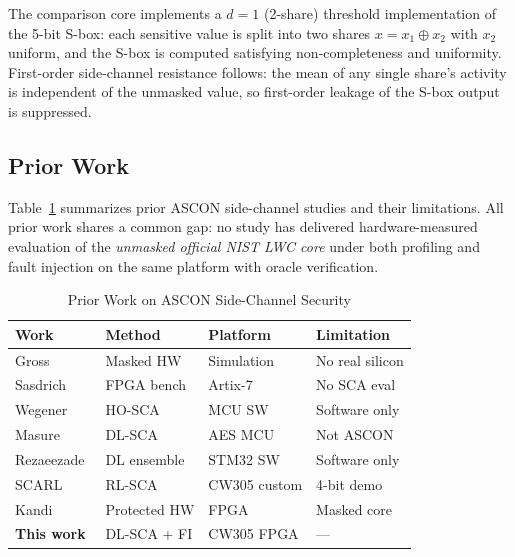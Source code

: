 \documentclass[conference]{IEEEtran}
\begin{document}
The comparison core implements a $d=1$ (2-share) threshold
implementation of the 5-bit S-box: each sensitive value is
split into two shares $x = x_1 \oplus x_2$ with $x_2$ uniform,
and the S-box is computed satisfying non-completeness and
uniformity. First-order side-channel resistance follows: the
mean of any single share's activity is independent of the
unmasked value, so first-order leakage of the S-box output is
suppressed.

\subsection{Prior Work}

Table~\ref{tab:related} summarizes prior ASCON side-channel
studies and their limitations. All prior work shares a common
gap: no study has delivered hardware-measured evaluation of
the \emph{unmasked official NIST LWC core} under both profiling
and fault injection on the same platform with oracle verification.

\begin{table}[htbp]
  \caption{Prior Work on ASCON Side-Channel Security}
  \label{tab:related}
  \centering
  \begin{tabular}{p{1.8cm} p{2.0cm} p{1.5cm} p{1.5cm}}
    \toprule
    \textbf{Work} & \textbf{Method} &
    \textbf{Platform} & \textbf{Limitation} \\
    \midrule
    Gross~\cite{gross2015ascon}
      & Masked HW & Simulation & No real silicon \\
    Sasdrich~\cite{sasdrich2015ascon}
      & FPGA bench & Artix-7 & No SCA eval \\
    Wegener~\cite{wegener2024ascon}
      & HO-SCA & MCU SW & Software only \\
    Masure~\cite{masure2020dlsca}
      & DL-SCA & AES MCU & Not ASCON \\
    Rezaeezade~\cite{rezaeezade2024ascon}
      & DL ensemble & STM32 SW & Software only \\
    SCARL~\cite{ramezanpour2020scar}
      & RL-SCA & CW305 custom & 4-bit demo \\
    Kandi~\cite{kandi2024ascon}
      & Protected HW & FPGA & Masked core \\
    \textbf{This work}
      & DL-SCA + FI & CW305 FPGA & — \\
    \bottomrule
  \end{tabular}
\end{table}

\end{document}
